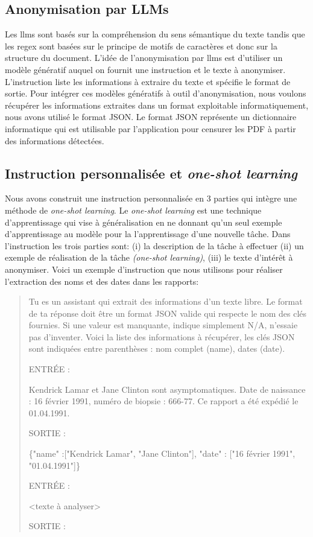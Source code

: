 \subsection{Anonymisation par LLMs}
Les \gls{llms} sont basés sur la compréhension du sens sémantique du texte tandis que les \gls{regex} sont basées sur le principe de motifs de caractères et donc sur la structure du document. L'idée de l'anonymisation par \gls{llms} est d'utiliser un modèle génératif auquel on fournit une instruction et le texte à anonymiser. L'instruction liste les informations à extraire du texte et spécifie le format de sortie. Pour intégrer ces modèles génératifs à outil d'anonymisation, nous voulons récupérer les informations extraites dans un format exploitable informatiquement, nous avons utilisé le format JSON. Le format JSON représente un dictionnaire informatique qui est utilisable par l'application pour censurer les PDF à partir des informations détectées.

\subsection{Instruction personnalisée et \textit{one-shot learning}}
Nous avons construit une instruction personnalisée en 3 parties qui intègre une méthode de \textit{one-shot learning}. Le \textit{one-shot learning} est une technique d'apprentissage qui vise à généralisation en ne donnant qu'un seul exemple d'apprentissage au modèle pour la l'apprentissage d'une nouvelle tâche. Dans l'instruction les trois parties sont: (i) la description de la tâche à effectuer (ii) un exemple de réalisation de la tâche \textit{(one-shot learning)}, (iii) le texte d'intérêt à anonymiser.
Voici un exemple d'instruction que nous utilisons pour réaliser l'extraction des noms et des dates dans les rapports:
\begin{quote}
Tu es un assistant qui extrait des informations d'un texte libre. Le format de ta réponse doit être un format JSON valide qui respecte le nom des clés fournies. Si une valeur est manquante, indique simplement N/A, n'essaie pas d'inventer. Voici la liste des informations à récupérer, les clés JSON sont indiquées entre parenthèses : nom complet (name), dates (date).

ENTRÉE :

Kendrick Lamar et Jane Clinton sont asymptomatiques. Date de naissance : 16 février 1991, numéro de biopsie : 666-77. Ce rapport a été expédié le 01.04.1991.

SORTIE :

\{"name" :["Kendrick Lamar", "Jane Clinton"], "date" : ["16 février 1991", "01.04.1991"]\}

ENTRÉE :

<texte à analyser>

SORTIE :
\end{quote}

